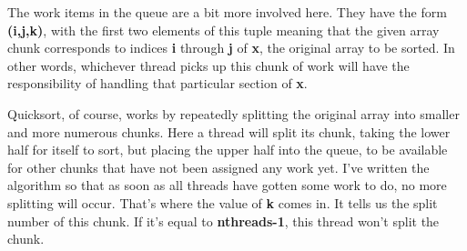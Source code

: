 The work items in the queue are a bit more involved here.  They have the
form {\bf (i,j,k)}, with the first two elements of this tuple meaning
that the given array chunk corresponds to indices {\bf i} through {\bf
j} of {\bf x}, the original array to be sorted.  In other words,
whichever thread picks up this chunk of work will have the
responsibility of handling that particular section of {\bf x}.

Quicksort, of course, works by repeatedly splitting the original array
into smaller and more numerous chunks.  Here a thread will split its
chunk, taking the lower half for itself to sort, but placing the upper
half into the queue, to be available for other chunks that have not been
assigned any work yet.  I've written the algorithm so that as soon as
all threads have gotten some work to do, no more splitting will occur.
That's where the value of {\bf k} comes in.  It tells us the split
number of this chunk.  If it's equal to {\bf nthreads-1}, this thread
won't split the chunk.

